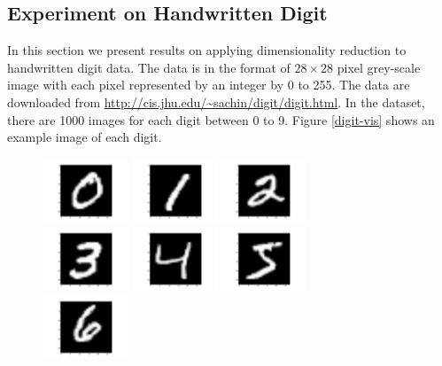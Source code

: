 \documentclass[11pt]{article}
\begin{document}
\begin{multicols}{2}
\section*{Experiment on Handwritten Digit}
In this section we present results on applying dimensionality reduction to handwritten digit data. The data is in the format of $28\times 28$ pixel grey-scale image with each pixel represented by an integer by 0 to 255. The data are downloaded from \url{http://cis.jhu.edu/~sachin/digit/digit.html}. In the dataset, there are 1000 images for each digit between 0 to 9. Figure \ref{digit-vis} shows an example image of each digit.
\begin{figure}[H]
\begin{center}
\includegraphics[width=1in]{0.png}
\includegraphics[width=1in]{1.png}
\includegraphics[width=1in]{2.png}\\
\includegraphics[width=1in]{3.png}
\includegraphics[width=1in]{4.png}
\includegraphics[width=1in]{5.png}\\
\includegraphics[width=1in]{6.png}

\end{center}
\end{figure}
\end{multicols}
\end{document}

